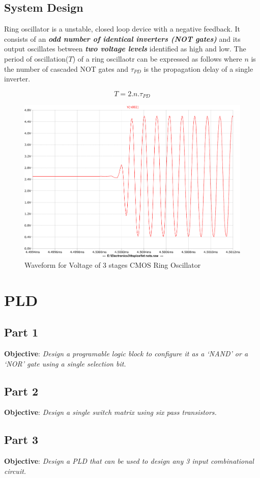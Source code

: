 \documentclass[a4paper,11pt]{article}%
\begin{document}
\subsection{System Design}
Ring oscillator is a unstable, closed loop device with a negative feedback. It consists of an \textbf{\textit{odd number of identical inverters (NOT gates)}} and its output oscillates between\textbf{\textit{ two voltage levels}} identified as high and low. The period of oscillation($T$) of a ring oscillaotr can be expressed as follows where $n$ is the number of cascaded NOT gates and $\tau_{PD}$ is the propagation delay of a single inverter.

\[
T = 2.n.\tau_{PD}
\]


\begin{figure}[!h]
\centering
\includegraphics[scale=0.6]{figures/cct1plot1}
\caption{Waveform for Voltage of 3 stages CMOS Ring Oscillator}

\end{figure}


\pagebreak
\section{PLD}
\subsection{Part 1}
\textbf{Objective}: \textit{Design a programable logic block to configure it as a `NAND' or a `NOR' gate using a single selection bit.}\\

\subsection{Part 2}
\textbf{Objective}: \textit{Design a single switch matrix using six pass transistors.}\\

\subsection{Part 3}
\textbf{Objective}: \textit{Design a PLD that can be used to design any 3 input
combinational circuit.}\\


%
%

\end{document}
